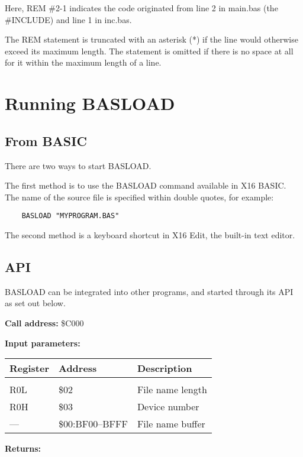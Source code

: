 \documentclass{article}
\begin{document}
        Here, REM \#2-1 indicates the code originated from line 2 in main.bas (the \#INCLUDE)
        and line 1 in inc.bas.

        The REM statement is truncated with an asterisk (*) if the line would otherwise
        exceed its maximum length. The statement is omitted if there is no space at all
        for it within the maximum length of a line.

\section{Running BASLOAD}

    \subsection{From BASIC}

        There are two ways to start BASLOAD.

        The first method is to use the BASLOAD command available in X16 BASIC. The
        name of the source file is specified within double quotes, for example:

        \begin{verbatim}
    BASLOAD "MYPROGRAM.BAS"
        \end{verbatim}

        The second method is a keyboard shortcut in X16 Edit, the built-in text editor.

    \subsection{API}

        BASLOAD can be integrated into other programs, and started through its
        API as set out below.

        \vspace{1em}
        \textbf{Call address:} \$C000

        \textbf{Input parameters:} 

        \begin{longtable}[l]{l l p{6cm}}
            \textbf{Register} & \textbf{Address} & \textbf{Description} \\
	        \hline \\
            R0L & \$02            & File name length \\
            R0H & \$03            & Device number \\
            ---  & \$00:BF00--BFFF & File name buffer \\
        \end{longtable}
        \vspace{-1.5em}
        \textbf{Returns:} 
\end{document}
